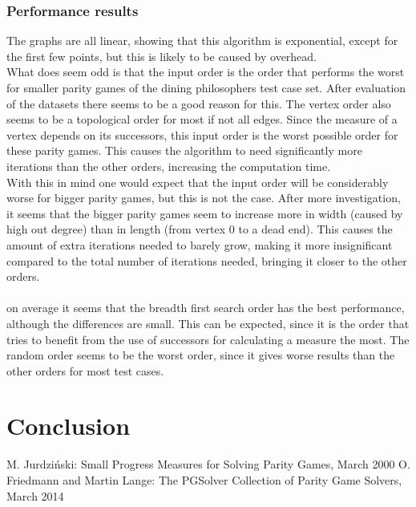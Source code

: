 \documentclass[10pt,a4paper]{article}
\begin{document}
\subsubsection{Performance results}
The graphs are all linear, showing that this algorithm is exponential, except for the first few points, but this is likely to be caused by overhead.\\
What does seem odd is that the input order is the order that performs the worst for smaller parity games of the dining philosophers test case set. After evaluation of the datasets there seems to be a good reason for this. The vertex order also seems to be a topological order for most if not all edges. Since the measure of a vertex depends on its successors, this input order is the worst possible order for these parity games. This causes the algorithm to need significantly more iterations than the other orders, increasing the computation time.\\
With this in mind one would expect that the input order will be considerably worse for bigger parity games, but this is not the case. After more investigation, it seems that the bigger parity games seem to increase more in width (caused by high out degree) than in length (from vertex 0 to a dead end). This causes the amount of extra iterations needed to barely grow, making it more insignificant compared to the total number of iterations needed, bringing it closer to the other orders.
\\\\
on average it seems that the breadth first search order has the best performance, although the differences are small. This can be expected, since it is the order that tries to benefit from the use of successors for calculating a measure the most. The random order seems to be the worst order, since it gives worse results than the other orders for most test cases.

\section{Conclusion}\label{conc}





\begin{thebibliography}{9}
 M. Jurdzi\'{n}ski: Small Progress Measures for Solving Parity Games, March 2000
 O. Friedmann and Martin Lange: The PGSolver Collection of Parity Game Solvers, March 2014
\end{thebibliography}
\end{document}
